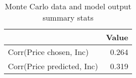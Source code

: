 \begin{table}[!ht]
	\centering
		\caption{Monte Carlo data and model output summary stats}
\begin{tabular}{lr}
		\toprule
               &     Value\\
		\midrule
		Corr(Price chosen, Inc)&     0.264\\
		Corr(Price predicted, Inc)&     0.319\\
		\bottomrule
	\end{tabular}
\end{table}
